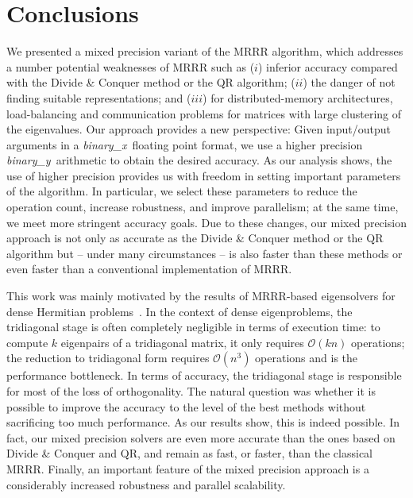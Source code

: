 \documentclass[final]{siamltex}
\newcommand\order[1]{\mathcal{O}(#1)}
\newcommand{\binaryx}{{\it binary\_\hspace*{1pt}x}}
\newcommand{\binaryy}{{\it binary\_\hspace*{0pt}y}}
\begin{document}
\section{Conclusions}

We presented a mixed precision variant of the MRRR algorithm, which addresses a
number potential weaknesses of MRRR such as ($i$) inferior
accuracy compared with the Divide \& Conquer method or the QR algorithm;
($ii$) the danger of not finding suitable representations; and ($iii$) for distributed-memory
architectures, load-balancing and
communication problems for matrices with large clustering of the
eigenvalues. Our approach provides a
new perspective: Given input/output arguments in a \binaryx\ floating
point format, we use a higher precision \binaryy\ arithmetic to
obtain the desired accuracy. As our analysis shows, the use of higher
precision provides us with freedom in setting important parameters of the
algorithm. In particular, we select these parameters to reduce the operation count,
increase robustness, and improve parallelism; at the same time, we meet
more stringent accuracy goals. Due to these changes, our mixed precision
approach is not only as accurate as the Divide \& Conquer method or the QR algorithm but -- under many
circumstances --  is also faster than  
these methods or even faster than a conventional implementation of MRRR. 

This work was mainly motivated by the results of MRRR-based eigensolvers for
dense Hermitian problems~\cite{EleMRRR}. In the context of dense
eigenproblems, the tridiagonal stage is often completely negligible
in terms of execution time: to compute $k$ eigenpairs of a tridiagonal matrix, it
only requires $\order{kn}$ operations; the reduction to
tridiagonal form requires $\order{n^3}$ operations and is the performance
bottleneck. In terms of accuracy, the 
tridiagonal stage is responsible for most of the loss of orthogonality. The
natural question was whether it is possible to improve the accuracy to the
level of the best methods without sacrificing too much performance. As
our results show, this is indeed possible. In fact, our mixed precision
solvers are even more accurate than the ones based on Divide \& Conquer and
QR, and remain as fast, or faster, than the classical MRRR. 
Finally, an important feature of the mixed precision approach is a
considerably increased robustness 
and parallel scalability. 



\footnotesize


\end{document}
